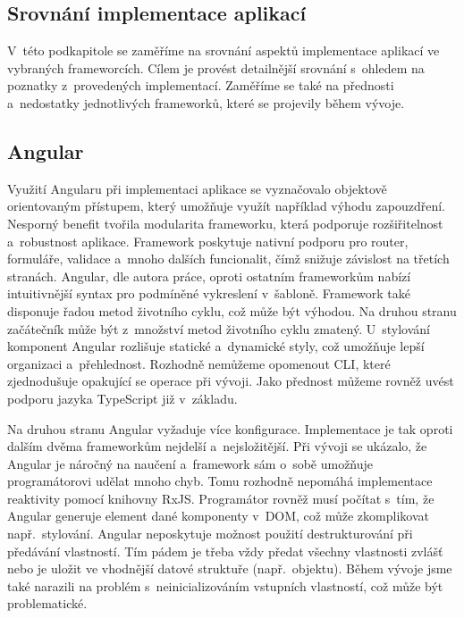 



\subsection{Srovnání implementace aplikací}

V~této podkapitole se zaměříme na srovnání aspektů implementace aplikací ve vybraných frameworcích. 
Cílem je provést detailnější srovnání s~ohledem na poznatky z~provedených implementací. 
Zaměříme se také na přednosti a~nedostatky jednotlivých frameworků, které se projevily během vývoje.

\subsection*{Angular}

Využití Angularu při implementaci aplikace se vyznačovalo objektově orientovaným přístupem, který umožňuje využít například výhodu zapouzdření. 
Nesporný benefit tvořila modularita frameworku, která podporuje rozšiřitelnost a~robustnost aplikace. 
Framework poskytuje nativní podporu pro router, formuláře, validace a~mnoho dalších funcionalit, čímž snižuje závislost na třetích stranách. 
Angular, dle autora práce, oproti ostatním frameworkům nabízí intuitivnější syntax pro podmíněné vykreslení v~šabloně. 
Framework také disponuje řadou metod životního cyklu, což může být výhodou. Na druhou stranu začátečník může být z~množství metod životního cyklu zmatený. 
U~stylování komponent Angular rozlišuje statické a~dynamické styly, což umožňuje lepší organizaci a~přehlednost. 
Rozhodně nemůžeme opomenout CLI, které zjednodušuje opakující se operace při vývoji. 
Jako přednost můžeme rovněž uvést podporu jazyka TypeScript již v~základu. 

Na druhou stranu Angular vyžaduje více konfigurace. Implementace je tak oproti dalším dvěma frameworkům nejdelší a~nejsložitější. 
Při vývoji se ukázalo, že Angular je náročný na naučení a~framework sám o~sobě umožňuje programátorovi udělat mnoho chyb. 
Tomu rozhodně nepomáhá implementace reaktivity pomocí knihovny RxJS. 
Programátor rovněž musí počítat s~tím, že Angular generuje element dané komponenty v~DOM, což může zkomplikovat např.~stylování. 
Angular neposkytuje možnost použití destrukturování při předávání vlastností. 
Tím pádem je třeba vždy předat všechny vlastnosti zvlášť nebo je uložit ve vhodnější datové struktuře (např.~objektu).
Během vývoje jsme také narazili na problém s~neinicializováním vstupních vlastností, což může být problematické. 

